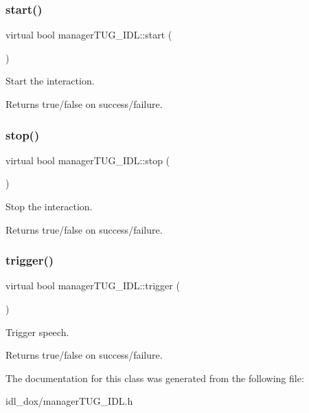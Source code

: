 \subsubsection{\texorpdfstring{start()}{start()}}
{\footnotesize\ttfamily virtual bool manager\+T\+U\+G\+\_\+\+I\+D\+L\+::start (\begin{DoxyParamCaption}{ }\end{DoxyParamCaption})\hspace{0.3cm}{\ttfamily [virtual]}}



Start the interaction. 

\begin{DoxyReturn}{Returns}
true/false on success/failure. 
\end{DoxyReturn}
\mbox{\label{classmanagerTUG__IDL_a4e4054e0f008e1207c08df67eb92a6ac}} 
\subsubsection{\texorpdfstring{stop()}{stop()}}
{\footnotesize\ttfamily virtual bool manager\+T\+U\+G\+\_\+\+I\+D\+L\+::stop (\begin{DoxyParamCaption}{ }\end{DoxyParamCaption})\hspace{0.3cm}{\ttfamily [virtual]}}



Stop the interaction. 

\begin{DoxyReturn}{Returns}
true/false on success/failure. 
\end{DoxyReturn}
\mbox{\label{classmanagerTUG__IDL_a0df471a196495dee8c7c8fbc19bd3827}} 
\subsubsection{\texorpdfstring{trigger()}{trigger()}}
{\footnotesize\ttfamily virtual bool manager\+T\+U\+G\+\_\+\+I\+D\+L\+::trigger (\begin{DoxyParamCaption}{ }\end{DoxyParamCaption})\hspace{0.3cm}{\ttfamily [virtual]}}



Trigger speech. 

\begin{DoxyReturn}{Returns}
true/false on success/failure. 
\end{DoxyReturn}


The documentation for this class was generated from the following file\+:\begin{DoxyCompactItemize}
\item 
idl\+\_\+dox/manager\+T\+U\+G\+\_\+\+I\+D\+L.\+h\end{DoxyCompactItemize}

